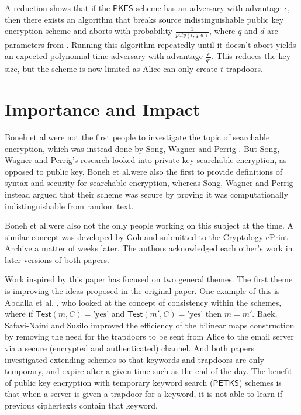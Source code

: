 \documentclass[a4paper,11pt]{article}
\begin{document}
    A reduction shows that if the $\mathsf{PKES}$ scheme has an adversary with advantage $\epsilon$, then there exists an algorithm that breaks source indistinguishable public key encryption scheme and aborts with probability $\frac{1}{poly(t, q, d)}$, where $q$ and $d$ are parameters from \cite{du:cover-free-families}. Running this algorithm repeatedly until it doesn't abort yields an expected polynomial time adversary with advantage $\frac{\epsilon}{q^2}$. This reduces the key size, but the scheme is now limited as Alice can only create $t$ trapdoors.

    \section{Importance and Impact}
    Boneh et al.\@ were not the first people to investigate the topic of searchable encryption, which was instead done by Song, Wagner and Perrig \cite{848445}. But Song, Wagner and Perrig's research looked into private key searchable encryption, as opposed to public key. Boneh et al.\@ were also the first to provide definitions of syntax and security for searchable encryption, whereas Song, Wagner and Perrig instead argued that their scheme was secure by proving it was computationally indistinguishable from random text.

    Boneh et al.\@ were also not the only people working on this subject at the time. A similar concept was developed by Goh \cite{cryptoeprint:2003:216} and submitted to the Cryptology ePrint Archive a matter of weeks later. The authors acknowledged each other's work in later versions of both papers.

    Work inspired by this paper has focused on two general themes. The first theme is improving the ideas proposed in the original paper. One example of this is Abdalla et al. \cite{abdalla:se-revisited}, who looked at the concept of consistency within the schemes, where if $\mathsf{Test}(m, C) = \text{'yes'}$ and $\mathsf{Test}(m', C) = \text{'yes'}$ then $m = m'$. Baek, Safavi-Naini and Susilo \cite{baek:se-revisited} improved the efficiency of the bilinear maps construction by removing the need for the trapdoors to be sent from Alice to the email server via a secure (encrypted and authenticated) channel. And both papers investigated extending schemes so that keywords and trapdoors are only temporary, and expire after a given time such as the end of the day. The benefit of public key encryption with temporary keyword search ($\mathsf{PETKS}$) schemes is that when a server is given a trapdoor for a keyword, it is not able to learn if previous ciphertexts contain that keyword.
\end{document}
